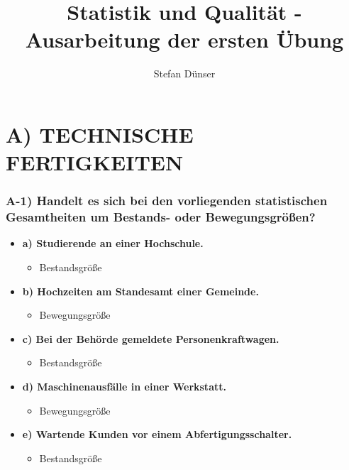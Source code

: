\documentclass[
]{article}
\title{Statistik und Qualität - Ausarbeitung der ersten Übung}
\author{Stefan Dünser}
\date{}
\providecommand{\tightlist}{%
  \setlength{\itemsep}{0pt}\setlength{\parskip}{0pt}}
\begin{document}
\maketitle

\hypertarget{a-technische-fertigkeiten}{%
\section{\texorpdfstring{A) TECHNISCHE FERTIGKEITEN\\
}{A) TECHNISCHE FERTIGKEITEN }}\label{a-technische-fertigkeiten}}

\hypertarget{a-1-handelt-es-sich-bei-den-vorliegenden-statistischen-gesamtheiten-um-bestands--oder-bewegungsgruxf6uxdfen}{%
\subsubsection{A-1) Handelt es sich bei den vorliegenden statistischen
Gesamtheiten um Bestands- oder
Bewegungsgrößen?}\label{a-1-handelt-es-sich-bei-den-vorliegenden-statistischen-gesamtheiten-um-bestands--oder-bewegungsgruxf6uxdfen}}

\begin{itemize}
\tightlist
\item
  \textbf{a) Studierende an einer Hochschule.}

  \begin{itemize}
  \tightlist
  \item
    Bestandsgröße
  \end{itemize}
\item
  \textbf{b) Hochzeiten am Standesamt einer Gemeinde.}

  \begin{itemize}
  \tightlist
  \item
    Bewegungsgröße
  \end{itemize}
\item
  \textbf{c) Bei der Behörde gemeldete Personenkraftwagen.}

  \begin{itemize}
  \tightlist
  \item
    Bestandsgröße
  \end{itemize}
\item
  \textbf{d) Maschinenausfälle in einer Werkstatt.}

  \begin{itemize}
  \tightlist
  \item
    Bewegungsgröße
  \end{itemize}
\item
  \textbf{e) Wartende Kunden vor einem Abfertigungsschalter.}

  \begin{itemize}
  \tightlist
  \item
    Bestandsgröße
  \end{itemize}
\end{itemize}
\end{document}
